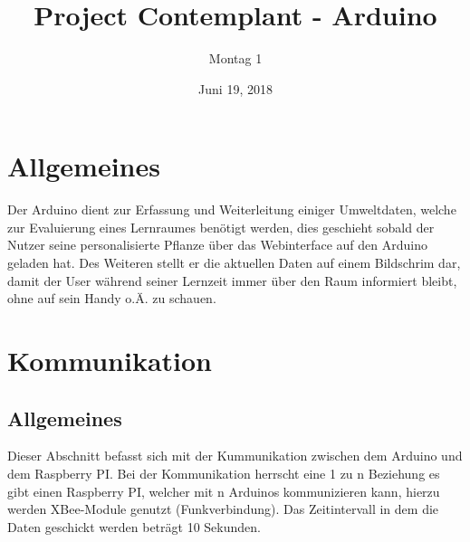 \documentclass{article}
\title{Project Contemplant - Arduino}
\date{Juni 19, 2018}
\author{Montag 1}
\begin{document}
\maketitle
\begin{versionhistory}
\end{versionhistory}
\newpage

\tableofcontents
\newpage
\section{Allgemeines}
Der Arduino dient zur Erfassung und Weiterleitung einiger Umweltdaten, welche zur Evaluierung eines Lernraumes benötigt werden, dies geschieht sobald der Nutzer seine personalisierte Pflanze über das Webinterface auf den Arduino geladen hat. \newline
Des Weiteren stellt er die aktuellen Daten auf einem Bildschrim dar, damit der User während seiner Lernzeit immer über den Raum informiert bleibt, ohne auf sein Handy o.Ä. zu schauen.
\newpage

\section{Kommunikation}
\subsection{Allgemeines}
Dieser Abschnitt befasst sich mit der Kummunikation zwischen dem Arduino und dem Raspberry PI.\newline
Bei der Kommunikation herrscht eine 1 zu n Beziehung es gibt einen Raspberry PI, welcher mit n Arduinos kommunizieren kann, 
hierzu werden XBee-Module genutzt (Funkverbindung).\newline
Das Zeitintervall in dem die Daten geschickt werden beträgt 10 Sekunden.\newline
\end{document}
